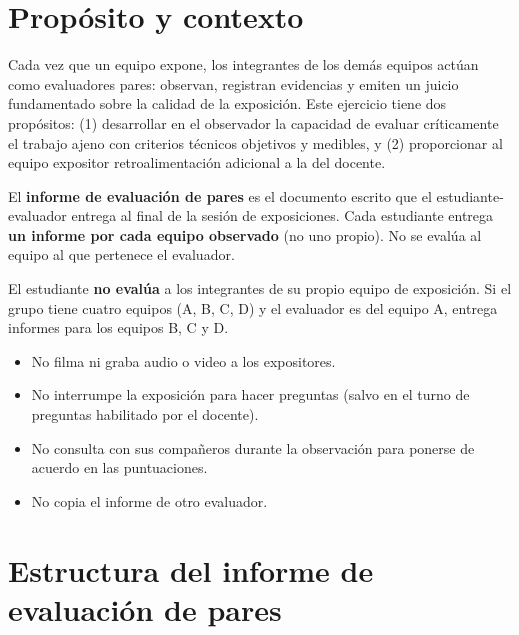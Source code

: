 \documentclass[11pt]{article}
\begin{document}
\newpage

\section{\textcolor{utegreendk}{Propósito y contexto}}

Cada vez que un equipo expone, los integrantes de los demás equipos actúan como evaluadores pares: observan, registran evidencias y emiten un juicio fundamentado sobre la calidad de la exposición. Este ejercicio tiene dos propósitos: (1) desarrollar en el observador la capacidad de evaluar críticamente el trabajo ajeno con criterios técnicos objetivos y medibles, y (2) proporcionar al equipo expositor retroalimentación adicional a la del docente.

El \textbf{informe de evaluación de pares} es el documento escrito que el estudiante-evaluador entrega al final de la sesión de exposiciones. Cada estudiante entrega \textbf{un informe por cada equipo observado} (no uno propio). No se evalúa al equipo al que pertenece el evaluador.

\begin{cajaclave}[title=Regla de exclusión]
	El estudiante \textbf{no evalúa} a los integrantes de su propio equipo de exposición. Si el grupo tiene cuatro equipos (A, B, C, D) y el evaluador es del equipo A, entrega informes para los equipos B, C y D.
\end{cajaclave}

\begin{cajaclave}[title=Qué NO debe hacer el evaluador]
	\begin{itemize}[leftmargin=14pt,itemsep=2pt]
		\item No filma ni graba audio o video a los expositores.
		\item No interrumpe la exposición para hacer preguntas (salvo en el turno de preguntas habilitado por el docente).
		\item No consulta con sus compañeros durante la observación para ponerse de acuerdo en las puntuaciones.
		\item No copia el informe de otro evaluador.
	\end{itemize}
\end{cajaclave}

\section{\textcolor{utegreendk}{Estructura del informe de evaluación de pares}}
\end{document}
